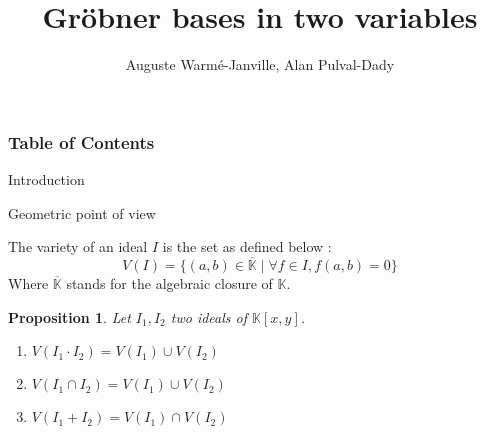 \documentclass{beamer}
\title{Gröbner bases in two variables}
\author{Auguste Warmé-Janville, Alan Pulval-Dady}
\institute{Sorbonne Université}
\newtheorem{proposition}{Proposition}[section]
\begin{document}
\frame{\titlepage}

\begin{frame}
    \frametitle{Table of Contents}
    \tableofcontents
\end{frame}


\begin{frame}{Introduction}
\end{frame}

\begin{frame}{Geometric point of view}
    \begin{definition} 
        The variety of an ideal $I$ is the set as defined below :
        \begin{displaymath}
            V(I) = \{ (a, b) \in \overline{\mathbb{K}} \mid \forall f \in I, f(a, b) = 0 \}
        \end{displaymath}
        Where $\overline{\mathbb{K}}$ stands for the algebraic closure of $\mathbb{K}$.
    \end{definition}
    \begin{proposition}
        Let $I_{1}, I_{2}$ two ideals of $\mathbb{K}[x, y]$.
        \begin{enumerate}
            \item[(i)] $V(I_{1} \cdot I_{2}) = V(I_{1}) \cup V(I_{2})$
            \item[(ii)] $V(I_{1} \cap I_{2}) = V(I_{1}) \cup V(I_{2})$
            \item[(iii)] $V(I_{1} + I_{2}) = V(I_{1}) \cap V(I_{2})$
        \end{enumerate}
    \end{proposition}
\end{frame}
\end{document}
